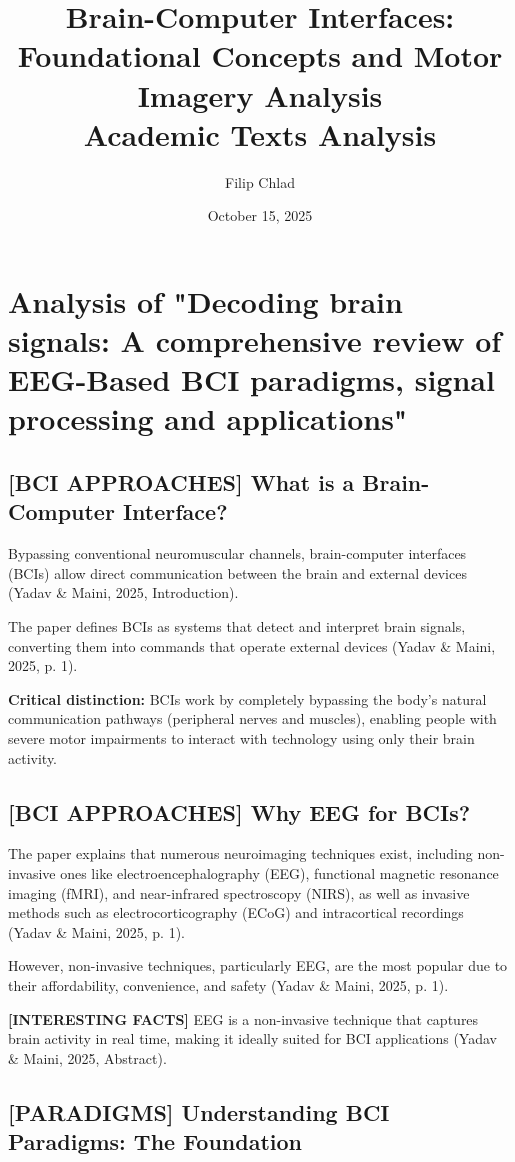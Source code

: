 \documentclass[12pt]{article}
\title{Brain-Computer Interfaces: Foundational Concepts and Motor Imagery Analysis\\
\large Academic Texts Analysis}
\author{Filip Chlad}
\date{October 15, 2025}
\begin{document}
\maketitle

\section{Analysis of "Decoding brain signals: A comprehensive review of EEG-Based BCI paradigms, signal processing and applications"}

\subsection{[BCI APPROACHES] What is a Brain-Computer Interface?}

Bypassing conventional neuromuscular channels, brain-computer interfaces (BCIs) allow direct communication between the brain and external devices (Yadav \& Maini, 2025, Introduction).

The paper defines BCIs as systems that detect and interpret brain signals, converting them into commands that operate external devices (Yadav \& Maini, 2025, p. 1).

\textbf{Critical distinction:} BCIs work by completely bypassing the body's natural communication pathways (peripheral nerves and muscles), enabling people with severe motor impairments to interact with technology using only their brain activity.

\subsection{[BCI APPROACHES] Why EEG for BCIs?}

The paper explains that numerous neuroimaging techniques exist, including non-invasive ones like electroencephalography (EEG), functional magnetic resonance imaging (fMRI), and near-infrared spectroscopy (NIRS), as well as invasive methods such as electrocorticography (ECoG) and intracortical recordings (Yadav \& Maini, 2025, p. 1).

However, non-invasive techniques, particularly EEG, are the most popular due to their affordability, convenience, and safety (Yadav \& Maini, 2025, p. 1).

\textbf{[INTERESTING FACTS]} EEG is a non-invasive technique that captures brain activity in real time, making it ideally suited for BCI applications (Yadav \& Maini, 2025, Abstract).

\subsection{[PARADIGMS] Understanding BCI Paradigms: The Foundation}
\end{document}
